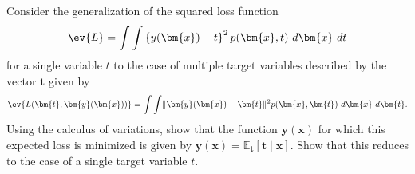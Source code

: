 \begin{question}{1.25}
	Consider the generalization of the squared loss function
	\begin{align*}
		\ev{L} = \int\int \left\{ y(\bm{x}) - t \right\}^2 p(\bm{x}, t)\ d\bm{x}\ dt
	\end{align*}
	for a single variable $t$ to the case of multiple target variables described by the vector $\bm{t}$ given by
	\begin{align*}
		\ev{L(\bm{t}, \bm{y}(\bm{x}))} = \int\int \lVert \bm{y}(\bm{x}) - \bm{t} \rVert^2 p(\bm{x}, \bm{t})\ d\bm{x}\ d\bm{t}.
	\end{align*}
	Using the calculus of variations, show that the function $\bm{y}(\bm{x})$ for which this expected loss is minimized is given by $\bm{y}(\bm{x}) = \mathbb{E}_{\bm{t}}\left[\bm{t} \mid \bm{x}\right]$. Show that this reduces to the case of a single target variable $t$.
\end{question}

